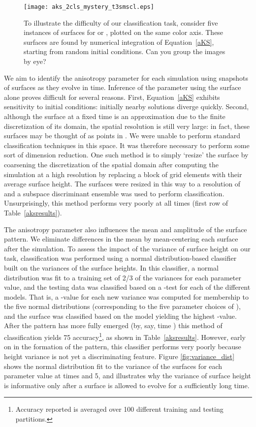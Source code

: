 \documentclass[11pt]{article}
\begin{document}
\begin{figure}[h!]
\captionsetup{singlelinecheck=off}
\centering
\texttt{[image: aks\_2cls\_mystery\_t3smscl.eps]}
\caption[NecessaryName-DontDelete]{To illustrate the difficulty of our classification task, consider five instances of surfaces  for  or , plotted on the same color axis. These surfaces are found by numerical integration of Equation~\eqref{aKS}, starting from random initial conditions. Can you group the images by eye?\\
}
\label{fig:quiz}
\end{figure}

We aim to identify the anisotropy parameter for each simulation using snapshots of surfaces  as they evolve in time.  Inference of the parameter using the surface alone proves difficult for several reasons.  First, Equation~\eqref{aKS} exhibits sensitivity to initial conditions: initially nearby solutions diverge quickly.  Second, although the surface  at a fixed time is an approximation due to the finite discretization of its domain, the spatial resolution is still very large: in fact, these surfaces may be thought of as points in .  We were unable to perform standard classification techniques in this space. It was therefore necessary to perform some sort of dimension reduction.  One such method is to simply `resize' the surface by coarsening the discretization of the spatial domain after computing the simulation at a high resolution by replacing a block of grid elements with their average surface height.  The surfaces were resized in this way to a resolution of  and a subspace discriminant ensemble was used to perform classification.  Unsurprisingly, this method performs very poorly at all times (first row of Table~\ref{aksresults}).


The anisotropy parameter also influences the mean and amplitude of the surface pattern.  We eliminate differences in the mean by mean-centering each surface after the simulation. To assess the impact of the variance of surface height on our task, classification was performed using a normal distribution-based classifier built on the variances of the surface heights. In this classifier, a normal distribution was fit to a training set of 2/3 of the variances for each parameter value, and the testing data was classified based on a -test for each of the different models. That is, a -value for each new variance was computed for membership to the five normal distributions (corresponding to the five parameter choices of ), and the surface was classified based on the model yielding the highest -value. After the pattern has more fully emerged (by, say, time ) this method of classification yields 75 accuracy\footnote{Accuracy reported is averaged over 100 different training and testing partitions.}, as shown in Table~\ref{aksresults}. However, early on in the formation of the pattern, this classifier performs very poorly because height variance is not yet a discriminating feature. Figure \ref{fig:variance_dist} shows the normal distribution fit to the variance of the surfaces for each parameter value at times  and 5, and illustrates why the variance of surface height is informative only after a surface is allowed to evolve for a sufficiently long time. 
\end{document}
